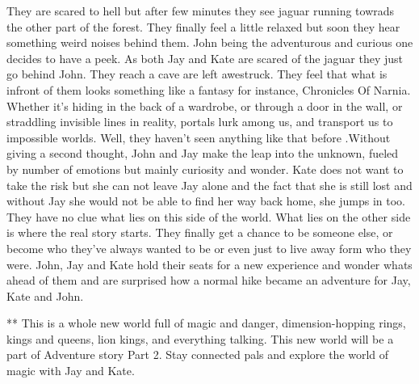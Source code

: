 \documentclass{article}
\begin{document}
They are scared to hell but after few minutes they see jaguar running towrads the other part of the forest. They finally feel a little relaxed but soon they hear something weird noises behind them. John being the adventurous and curious one decides to have a peek. As both Jay and Kate are scared of the jaguar they just go behind John. They reach a cave are left awestruck. They feel that what is infront of them looks something like a fantasy for instance, Chronicles Of Narnia. Whether it’s hiding in the back of a wardrobe, or through a door in the wall, or straddling invisible lines in reality, portals lurk among us, and transport us to impossible worlds. Well, they haven't seen anything like that before .Without giving a second thought, John and Jay make the leap into the unknown, fueled by number of emotions but mainly curiosity and wonder. Kate does not want to take the risk but she can not leave Jay alone and the fact that she is still lost and without Jay she would not be able to find her way back home, she jumps in too. They have no clue what lies on this side of the world. What lies on the other side is where the real story starts. They finally get a chance to be someone else, or become who they've always wanted to be or even just to live away form who they were. John, Jay and Kate hold their seats for a new experience and wonder whats ahead of them and are surprised how a normal hike became an adventure for Jay, Kate and John.

{\selectfont
**
This is a whole new world full of magic and danger, dimension-hopping rings, kings and queens, lion kings, and everything talking. This new world will be a part of Adventure story Part 2. Stay connected pals and explore the world of magic with Jay and Kate.
}
\end{document}
